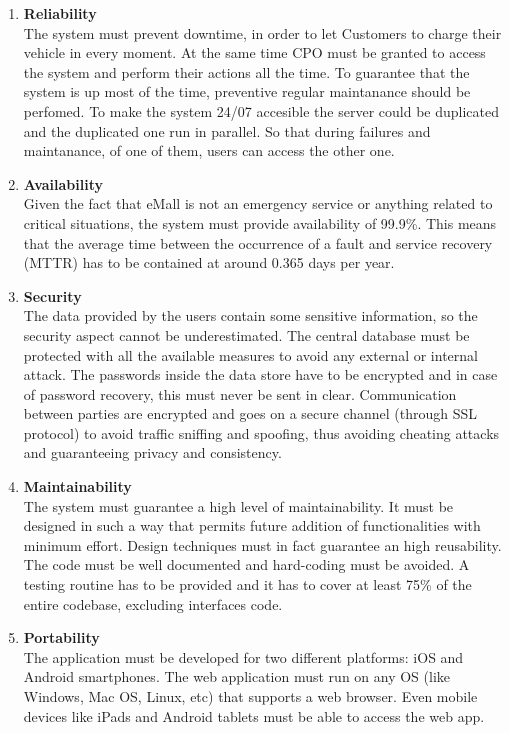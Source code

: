 \begin{enumerate}[label=\textbf{NFR\arabic*}:]
    \item \textbf{Reliability}\\
    The system must prevent downtime, in order to let Customers to charge their vehicle in every moment. At the same time CPO must be granted to access the system and perform their actions all the time.
    To guarantee that the system is up most of the time, preventive regular maintanance should be perfomed. To make the system 24/07 accesible the server could be duplicated and the duplicated one run in parallel. So that during failures and maintanance, of one of them, users can access the other one. 
    \item \textbf{Availability}\\
    Given the fact that eMall is not an emergency service or anything related to critical situations, the system must provide availability of 99.9\%. This means that the average time between the occurrence of a fault and service recovery (MTTR) has to be contained at around 0.365 days per year.
    \item \textbf{Security}\\
    The data provided by the users contain some sensitive information, so the security aspect cannot be underestimated. The central database must be protected with all the available measures to avoid any external or internal attack. The passwords inside the data store have to be encrypted and in case of password recovery, this must never be sent in clear.
    Communication between parties are encrypted and goes on a secure channel (through SSL protocol) to avoid traffic sniffing and spoofing, thus avoiding cheating attacks and guaranteeing privacy and consistency.
    \item \textbf{Maintainability}\\
    The system must guarantee a high level of maintainability. It must be designed in such a way that permits future addition of functionalities with minimum effort.
    Design techniques must in fact guarantee an high reusability. The code must be well documented and hard-coding must be avoided. A testing routine has to be provided and it has to cover at least 75\% of the entire codebase, excluding interfaces code.
    \item \textbf{Portability}\\
    The application must be developed for two different platforms: iOS and Android smartphones. The web application must run on any OS (like Windows, Mac OS, Linux, etc) that supports a web browser. Even mobile devices like iPads and Android tablets must be able to access the web app.
\end{enumerate}

